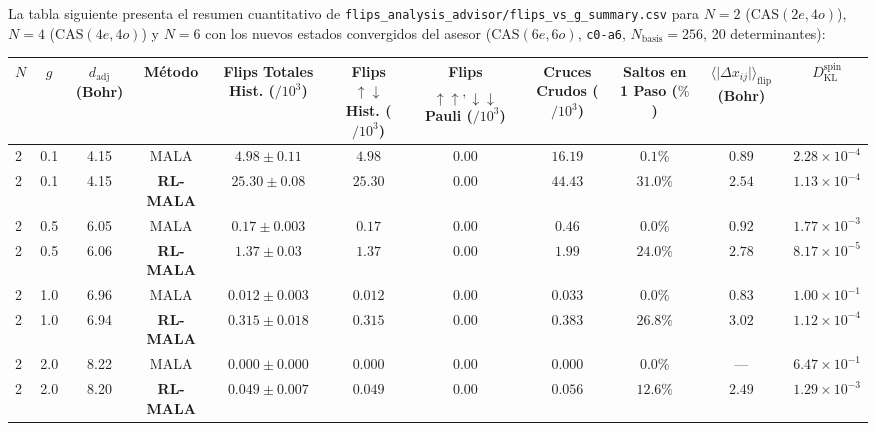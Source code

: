 \documentclass[10pt,a4paper]{article}
\begin{document}
La tabla siguiente presenta el resumen cuantitativo de \texttt{flips\_analysis\_advisor/flips\_vs\_g\_summary.csv} para $N=2$ ($\mathrm{CAS}(2e, 4o)$), $N=4$ ($\mathrm{CAS}(4e, 4o)$) y $N=6$ con los nuevos estados convergidos del asesor ($\mathrm{CAS}(6e, 6o)$, \texttt{c0-a6}, $N_{\mathrm{basis}}=256$, 20 determinantes):



\begin{table}[H]
\centering
\begin{adjustbox}{max width=\textwidth}
\begin{tabular}{lcccccccccc}
\toprule
\textbf{$N$} & \textbf{$g$} & \textbf{$d_{\mathrm{adj}}$ (Bohr)} & \textbf{Método} & \textbf{Flips Totales Hist. ($/10^3$)} & \textbf{Flips $\uparrow\downarrow$ Hist. ($/10^3$)} & \textbf{Flips $\uparrow\uparrow,\downarrow\downarrow$ Pauli ($/10^3$)} & \textbf{Cruces Crudos ($/10^3$)} & \textbf{Saltos en 1 Paso ($\%$)} & \textbf{$\langle\lvert\Delta x_{ij}\rvert\rangle_{\mathrm{flip}}$ (Bohr)} & \textbf{$D_{\mathrm{KL}}^{\mathrm{spin}}$} \\
\midrule
2 & 0.1 & 4.15 & MALA & $4.98 \pm 0.11$ & $4.98$ & $0.00$ & $16.19$ & $0.1\%$ & $0.89$ & $2.28 \times 10^{-4}$ \\
2 & 0.1 & 4.15 & \textbf{RL-MALA} & \textbf{$25.30 \pm 0.08$} & \textbf{$25.30$} & \textbf{$0.00$} & \textbf{$44.43$} & \textbf{$31.0\%$} & \textbf{$2.54$} & \textbf{$1.13 \times 10^{-4}$} \\
2 & 0.5 & 6.05 & MALA & $0.17 \pm 0.003$ & $0.17$ & $0.00$ & $0.46$ & $0.0\%$ & $0.92$ & $1.77 \times 10^{-3}$ \\
2 & 0.5 & 6.06 & \textbf{RL-MALA} & \textbf{$1.37 \pm 0.03$} & \textbf{$1.37$} & \textbf{$0.00$} & \textbf{$1.99$} & \textbf{$24.0\%$} & \textbf{$2.78$} & \textbf{$8.17 \times 10^{-5}$} \\
2 & 1.0 & 6.96 & MALA & $0.012 \pm 0.003$ & $0.012$ & $0.00$ & $0.033$ & $0.0\%$ & $0.83$ & $1.00 \times 10^{-1}$ \\
2 & 1.0 & 6.94 & \textbf{RL-MALA} & \textbf{$0.315 \pm 0.018$} & \textbf{$0.315$} & \textbf{$0.00$} & \textbf{$0.383$} & \textbf{$26.8\%$} & \textbf{$3.02$} & \textbf{$1.12 \times 10^{-4}$} \\
2 & 2.0 & 8.22 & MALA & $0.000 \pm 0.000$ & $0.000$ & $0.00$ & $0.000$ & $0.0\%$ & --- & $6.47 \times 10^{-1}$ \\
2 & 2.0 & 8.20 & \textbf{RL-MALA} & \textbf{$0.049 \pm 0.007$} & \textbf{$0.049$} & \textbf{$0.00$} & \textbf{$0.056$} & \textbf{$12.6\%$} & \textbf{$2.49$} & \textbf{$1.29 \times 10^{-3}$} \\

\end{tabular}
\end{adjustbox}
\end{table}
\end{document}
